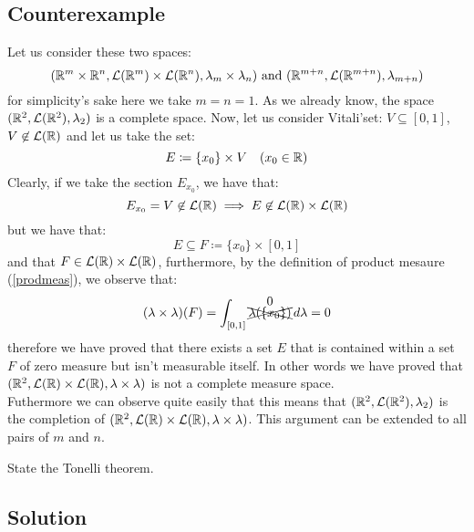 \subsection{Counterexample}
Let us consider these two spaces:
\[
    (\mathbb{R}^m \times \mathbb{R}^n, \mathcal{L}(\mathbb{R}^m) \times \mathcal{L}(\mathbb{R}^n), \lambda_m \times \lambda_n ) \text{ and } (\mathbb{R}^{m+n}, \mathcal{L}(\mathbb{R}^{m+n}), \lambda_{m+n})
\]
for simplicity's sake here we take $m=n=1$. As we already know, the space $(\mathbb{R}^2, \mathcal{L}(\mathbb{R}^2), \lambda_2)$ is a complete space. Now, let us consider Vitali'set: $V\subseteq[0,1]$, $V\not\in\mathcal{L}(\mathbb{R})$ and let us take the set:
\[
    E \coloneqq \{ x_0 \} \times V \quad (x_0\in\mathbb{R})    
\]
Clearly, if we take the section $E_{x_0}$, we have that:
\[
    E_{x_0} = V \not\in \mathcal{L}(\mathbb{R}) \implies E \not\in \mathcal{L}(\mathbb{R}) \times \mathcal{L}(\mathbb{R})    
\]
but we have that:
\[
    E \subseteq F \coloneqq \{ x_0 \} \times [0,1]    
\]
and that $F\in \mathcal{L}(\mathbb{R}) \times \mathcal{L}(\mathbb{R})$, furthermore, by the definition of product mesaure (\ref{prodmeas}), we observe that:
\[
    (\lambda \times \lambda)(F) = \int_{[0,1]} \overset{\text{\normalsize0}}{\xcancel{\lambda(\{ x_0 \})}} \, d\lambda = 0    
\]
therefore we have proved that there exists a set $E$ that is contained within a set $F$ of zero measure but isn't measurable itself. In other words we have proved that $(\mathbb{R}^2, \mathcal{L}(\mathbb{R})\times\mathcal{L}(\mathbb{R}), \lambda \times \lambda)$ is not a complete measure space.\\
Futhermore we can observe quite easily that this means that $(\mathbb{R}^2, \mathcal{L}(\mathbb{R}^2), \lambda_2)$ is the completion of $(\mathbb{R}^2, \mathcal{L}(\mathbb{R})\times\mathcal{L}(\mathbb{R}), \lambda \times \lambda)$. This argument can be extended to all pairs of $m$ and $n$.


\question
State the Tonelli theorem.

\subsection*{Solution}


